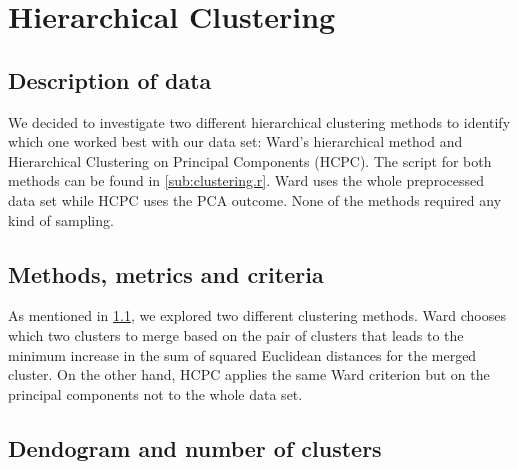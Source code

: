 

\section{Hierarchical Clustering}%
\label{sec:hierarchical_clustering}

\subsection{Description of data}%
\label{sub:description_data}


We decided to investigate two different hierarchical clustering methods to
identify which one worked best with our data set: Ward's hierarchical method and 
Hierarchical Clustering on Principal Components (HCPC). The script for both methods
can be found in \cref{sub:clustering.r}. Ward uses
the whole preprocessed data set while HCPC uses the PCA outcome. None of the
methods required any kind of sampling.

\subsection{Methods, metrics and criteria}


As mentioned in \cref{sub:description_data}, we explored two different clustering methods.
Ward chooses which two clusters to merge based on the pair of clusters that leads to the
minimum increase in the sum of squared Euclidean distances for the merged cluster. 
On the other hand, HCPC applies the same Ward criterion but on the principal components 
not to the whole data set.


\subsection{Dendogram and number of clusters}%
\label{sub:dendogram}

